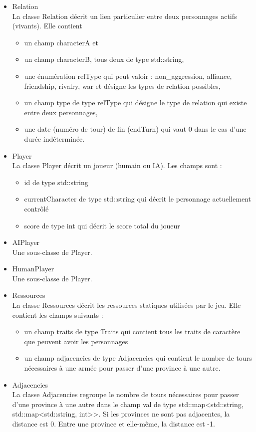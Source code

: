 \documentclass[a4paper,12pt]{article}
\begin{document}
\begin{itemize}
\item Relation\\
La classe Relation décrit un lien particulier entre deux personnages actifs (vivants). Elle contient 
\begin{itemize}
\item un champ characterA et 
\item un champ characterB, tous deux de type std::string,
\item une énumération relType qui peut valoir : {non\_aggression, alliance, friendship, rivalry, war} et désigne les types de relation possibles,
\item un champ type de type relType qui désigne le type de relation qui existe entre deux personnages,
\item une date (numéro de tour) de fin (endTurn) qui vaut 0 dans le cas d'une durée indéterminée.
\end{itemize}

\item Player\\
La classe Player décrit un joueur (humain ou IA).
Les champs sont :
\begin{itemize}
\item id de type std::string
\item currentCharacter de type std::string qui décrit le personnage actuellement contrôlé
\item score de type int qui décrit  le score total du joueur
\end{itemize}
\item AIPlayer\\
Une sous-classe de Player.
\item HumanPlayer\\
Une sous-classe de Player.

\item Ressources\\
La classe Ressources décrit les ressources statiques utilisées par le jeu. Elle contient les champs suivants :
\begin{itemize}
\item un champ traits de type Traits qui contient tous les traits de caractère que peuvent avoir les personnages
\item un champ adjacencies de type Adjacencies qui contient le nombre de tours nécessaires à une armée pour passer d'une province à une autre.
\end{itemize}

\item Adjacencies\\
La classe Adjacencies regroupe le nombre de tours nécessaires pour passer d'une province à une autre dans le champ val de type std::map<std::string, std::map<std::string, int>>. Si les provinces ne sont pas adjacentes, la distance est 0. Entre une province et elle-même, la distance est -1.


\end{itemize}
\end{document}

